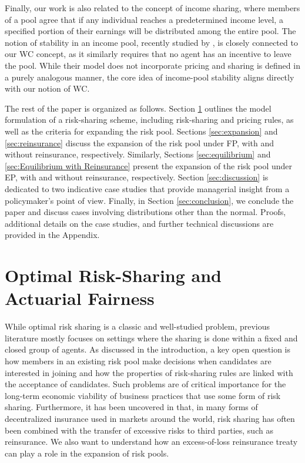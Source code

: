 \documentclass[fleqn,mnsc,nonblindrev]{informs4}
\begin{document}
Finally, our work is also related to the concept of income sharing, where members of a pool agree that if any individual reaches a predetermined income level, a specified portion of their earnings will be distributed among the entire pool. The notion of stability in an income pool, recently studied by \cite{ChaCheFer24}, is closely connected to our WC concept, as it similarly requires that no agent has an incentive to leave the pool. While their model does not incorporate pricing and sharing is defined in a purely analogous manner, the core idea of income-pool stability aligns directly with our notion of WC.


\smallskip

The rest of the paper is organized as follows. Section \ref{sec:Optimal Sharing} outlines the model formulation of a risk-sharing scheme, including risk-sharing and pricing rules, as well as the criteria for expanding the risk pool. Sections \ref{sec:expansion} and \ref{sec:reinsurance} discuss the expansion of the risk pool under FP, with and without reinsurance, respectively. Similarly, Sections \ref{sec:equilibrium} and \ref{sec:Equilibrium with Reinsurance} present the expansion of the risk pool under EP, with and without reinsurance, respectively.    {Section \ref{sec:discussion} is dedicated to two indicative case studies that provide managerial insight from a policymaker's point of view. Finally, in Section \ref{sec:conclusion}, we conclude the paper and discuss cases involving distributions other than the normal. Proofs, additional details on the case studies, and further technical discussions are provided in the Appendix.}

\section{Optimal Risk-Sharing and Actuarial Fairness}\label{sec:Optimal Sharing}

While optimal risk sharing is a classic and well-studied problem, previous literature mostly focuses on settings where the sharing is done within a fixed and closed group of agents. As discussed in the introduction, a key open question is how members in an existing risk pool make decisions when candidates are interested in joining and how the properties of risk-sharing rules are linked with the acceptance of candidates. Such problems are of critical importance for the long-term economic viability of business practices that use some form of risk sharing. 
Furthermore, it has been uncovered in \cite{feng2024unified} that, in many forms of decentralized insurance used in markets around the world, risk sharing has often been combined with the transfer of excessive risks to third parties, such as reinsurance. We also want to understand how an excess-of-loss reinsurance treaty can play a role in the expansion of risk pools.
\end{document}
